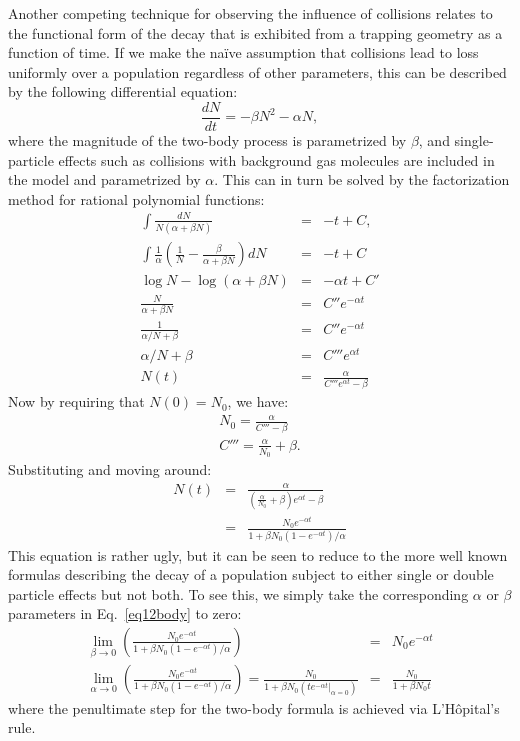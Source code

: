 Another competing technique for observing the influence of collisions relates to the functional form of the decay that is exhibited from a trapping geometry as a function of time.
If we make the na\"{i}ve assumption that collisions lead to loss uniformly over a population regardless of other parameters, this can be described by the following differential equation:
\begin{equation}
\frac{dN}{dt} = - \beta N^2  -\alpha N,
\end{equation}
where the magnitude of the two-body process is parametrized by $\beta$, and single-particle effects such as collisions with background gas molecules are included in the model and parametrized by $\alpha$.
This can in turn be solved by the factorization method for rational polynomial functions:
\begin{eqnarray}
\int\frac{dN}{N(\alpha+\beta N)} &=&- t + C,\\
\int\frac{1}{\alpha}\left(\frac{1}{N} - \frac{\beta}{\alpha +\beta N}  \right)dN &=& -t+C\\
\log{N} - \log{\left(\alpha + \beta N\right)} &=& -\alpha t + C'\\
\frac{N}{\alpha + \beta N} &=& C''e^{-\alpha t}\\
\frac{1}{\alpha/N + \beta} &=& C''e^{-\alpha t}\\
\alpha/N + \beta &=& C'''e^{\alpha t}\\
N(t) &=& \frac{\alpha}{C'''e^{\alpha t}-\beta}
\end{eqnarray}
Now by requiring that $N(0)=N_0$, we have:
\begin{eqnarray}
N_0 = \frac{\alpha}{C'''-\beta}\\
C''' = \frac{\alpha}{N_0}+\beta.
\end{eqnarray}
Substituting and moving around:
\begin{eqnarray}
N(t) &=& \frac{\alpha}{(\frac{\alpha}{N_0}+\beta)e^{\alpha t}-\beta}\\
&=& \frac{N_0 e^{-\alpha t}}{1 +\beta N_0(1-e^{-\alpha t})/\alpha}\label{eq12body}
\end{eqnarray}
This equation is rather ugly, but it can be seen to reduce to the more well known formulas describing the decay of a population subject to either single or double particle effects but not both.
To see this, we simply take the corresponding $\alpha$ or $\beta$ parameters in Eq.~\ref{eq12body} to zero:
\begin{eqnarray}
\lim_{\beta\rightarrow 0} \left(\frac{N_0 e^{-\alpha t}}{1 +\beta N_0(1-e^{-\alpha t})/\alpha}\right) &=& N_0 e^{-\alpha t}\\
\lim_{\alpha\rightarrow 0} \left(\frac{N_0 e^{-\alpha t}}{1 +\beta N_0(1-e^{-\alpha t})/\alpha}\right) = \frac{N_0}{1+\beta N_0 \left( te^{-\alpha t}|_{\alpha=0} \right)} &=& \frac{N_0}{1+\beta N_0 t} \label{2bodyeq}
\end{eqnarray}
where the penultimate step for the two-body formula is achieved via L'H\^{o}pital's rule.

